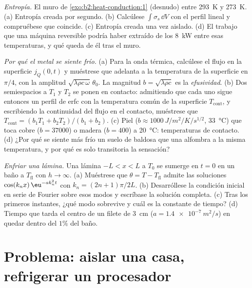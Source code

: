 \begin{exercise}[$\star\star\star$]\label{exo:b2:heat-conduction:10}
\emph{Entropía.} El muro de \cref{exo:b2:heat-conduction:1} (desnudo)
entre \qty{293}{K} y \qty{273}{K}. (a) Entropía creada por segundo.
(b) Calcúlese $\int\sigma_s\,\dd V$ con el perfil lineal y compruébese que
coincide. (c) Entropía creada una vez aislado. (d) El trabajo que una
máquina reversible podría haber extraído de los \qty{8}{kW} entre
esas temperaturas, y qué queda de él tras el muro.
\end{exercise}

\begin{exercise}[$\star\star\star$]\label{exo:b2:heat-conduction:11}
\emph{Por qué el metal se siente frío.} (a) Para la onda térmica, calcúlese el
flujo en la superficie $j_Q(0,t)$ y muéstrese que adelanta a la temperatura de la superficie en
$\pi/4$, con la amplitud $\sqrt{\lambda\rho c\,\omega}\,\theta_0$. La
magnitud $b = \sqrt{\lambda\rho c}$ es la \emph{efusividad}. (b) Dos
semiespacios a $T_1$ y $T_2$ se ponen en contacto: admitiendo que
cada uno sigue entonces un perfil de erfc con la temperatura común de la superficie
$T_{\text{cont}}$, y escribiendo la continuidad del flujo en el contacto,
muéstrese que $T_{\text{cont}} = (b_1T_1 + b_2T_2)/(b_1 + b_2)$. (c) Piel
($b \approx \qty{1000}{J/m^2/K/s^{1/2}}$, \qty{33}{\celsius}) que toca
cobre ($b = 37000$) o madera ($b = 400$) a \qty{20}{\celsius}: temperaturas
de contacto. (d) ¿Por qué se siente más frío un suelo de baldosa que una alfombra a
la misma temperatura, y por qué es solo transitoria la sensación?
\end{exercise}

\begin{exercise}[$\star\star\star$]\label{exo:b2:heat-conduction:12}
\emph{Enfriar una lámina.} Una lámina $-L < x < L$ a $T_0$ se sumerge en $t =
0$ en un baño a $T_{\text{fl}}$ con $h \to \infty$. (a) Muéstrese que $\theta =
T - T_{\text{fl}}$ admite las soluciones $\cos(k_nx)\,\eu^{-ak_n^2t}$ con $k_n
= (2n+1)\pi/2L$. (b) Desarróllese la condición inicial en serie de Fourier
sobre esos modos y escríbase la solución completa. (c) Tras los primeros
instantes, ¿qué modo sobrevive y cuál es la constante de tiempo? (d) Tiempo
que tarda el centro de un filete de \qty{3}{cm} ($a = \qty{1.4e-7}{m^2/s}$) en quedar
dentro del $1\%$ del baño.
\end{exercise}

\section{Problema: aislar una casa, refrigerar un procesador}

